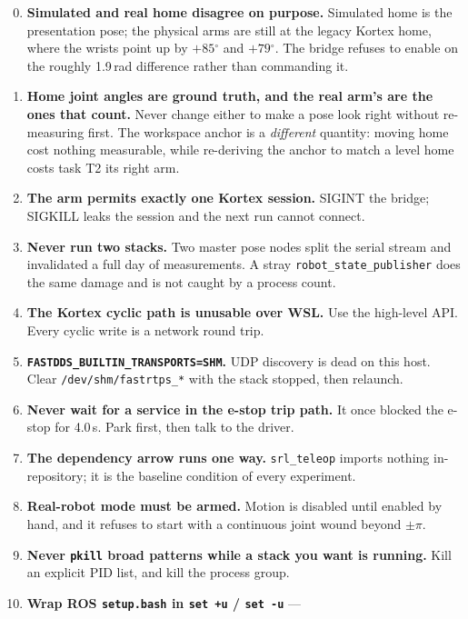\documentclass[11pt,a4paper,oneside]{report}
\newcommand{\code}[1]{\texttt{\small #1}}
\newcommand{\file}[1]{\texttt{\small #1}}
\newcommand{\dg}{$^{\circ}$}
\begin{document}
\begin{enumerate}
\setcounter{enumi}{-1}
\item \textbf{Simulated and real home disagree on purpose.} Simulated home is
      the presentation pose; the physical arms are still at the legacy Kortex
      home, where the wrists point up by $+85$\dg{} and $+79$\dg. The bridge
      refuses to enable on the roughly 1.9\,rad difference rather than
      commanding it.
\item \textbf{Home joint angles are ground truth, and the real arm's are the
      ones that count.} Never change either to make a pose look right without
      re-measuring first. The workspace anchor is a \emph{different} quantity:
      moving home cost nothing measurable, while re-deriving the anchor to
      match a level home costs task T2 its right arm.
\item \textbf{The arm permits exactly one Kortex session.} SIGINT the bridge;
      SIGKILL leaks the session and the next run cannot connect.
\item \textbf{Never run two stacks.} Two master pose nodes split the serial
      stream and invalidated a full day of measurements. A stray
      \code{robot\_state\_publisher} does the same damage and is not caught by
      a process count.
\item \textbf{The Kortex cyclic path is unusable over WSL.} Use the high-level
      API. Every cyclic write is a network round trip.
\item \textbf{\code{FASTDDS\_BUILTIN\_TRANSPORTS=SHM}.} UDP discovery is dead
      on this host. Clear \file{/dev/shm/fastrtps\_*} with the stack stopped,
      then relaunch.
\item \textbf{Never wait for a service in the e-stop trip path.} It once
      blocked the e-stop for 4.0\,s. Park first, then talk to the driver.
\item \textbf{The dependency arrow runs one way.} \code{srl\_teleop} imports
      nothing in-repository; it is the baseline condition of every experiment.
\item \textbf{Real-robot mode must be armed.} Motion is disabled until enabled
      by hand, and it refuses to start with a continuous joint wound beyond
      $\pm\pi$.
\item \textbf{Never \code{pkill} broad patterns while a stack you want is
      running.} Kill an explicit PID list, and kill the process group.
\item \textbf{Wrap ROS \file{setup.bash} in \code{set +u} / \code{set -u}} ---

\end{enumerate}
\end{document}
